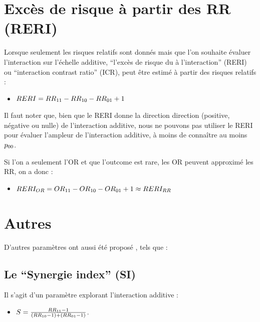 \documentclass[
]{book}
\providecommand{\tightlist}{%
  \setlength{\itemsep}{0pt}\setlength{\parskip}{0pt}}
\begin{document}
\hypertarget{excuxe8s-de-risque-uxe0-partir-des-rr-reri}{%
\section{Excès de risque à partir des RR (RERI)}\label{excuxe8s-de-risque-uxe0-partir-des-rr-reri}}

Lorsque seulement les risques relatifs sont donnés mais que l'on souhaite évaluer l'interaction sur l'échelle additive, ``l'excès de risque du à l'interaction'' (RERI) ou ``interaction contrast ratio'' (ICR), peut être estimé à partir des risques relatifs \citet{vanderweele_tutorial_2014} :

\begin{itemize}
\tightlist
\item
  \(\small RERI = RR_{11} - RR_{10} - RR_{01} + 1\)
\end{itemize}

Il faut noter que, bien que le RERI donne la direction direction (positive, négative ou nulle) de l'interaction additive, nous ne pouvons pas utiliser le RERI pour évaluer l'ampleur de l'interaction additive, à moins de connaître au moins \(\small p_{00}\).

Si l'on a seulement l'OR et que l'outcome est rare, les OR peuvent approximé les RR, on a donc :

\begin{itemize}
\tightlist
\item
  \(\small RERI_{OR} = OR_{11} - OR_{10} - OR_{01} + 1 \approx RERI_{RR}\)
\end{itemize}

\hypertarget{autres}{%
\section{Autres}\label{autres}}

D'autres paramètres ont aussi été proposé \citet{vanderweele_tutorial_2014}, tels que :

\hypertarget{le-synergie-index-si}{%
\subsection*{Le ``Synergie index'' (SI)}\label{le-synergie-index-si}}

Il s'agit d'un paramètre explorant l'interaction additive :

\begin{itemize}
\tightlist
\item
  \(\small S = \frac{RR_{11} - 1}{(RR_{10} - 1) + (RR_{01}-1)}\).
\end{itemize}
\end{document}
